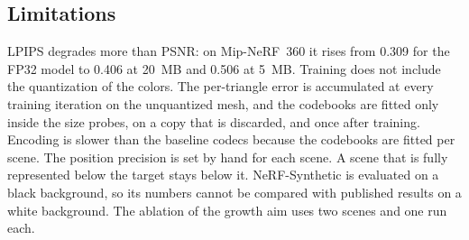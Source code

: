 \subsection{Limitations}
\label{sec:limits}
LPIPS degrades more than PSNR: on Mip-NeRF~360 it rises from 0.309 for the FP32 model to 0.406 at 20~MB and 0.506 at 5~MB. Training does not include the quantization of the colors. The per-triangle error is accumulated at every training iteration on the unquantized mesh, and the codebooks are fitted only inside the size probes, on a copy that is discarded, and once after training. Encoding is slower than the baseline codecs because the codebooks are fitted per scene. The position precision is set by hand for each scene. A scene that is fully represented below the target stays below it. NeRF-Synthetic is evaluated on a black background, so its numbers cannot be compared with published results on a white background. The ablation of the growth aim uses two scenes and one run each.

